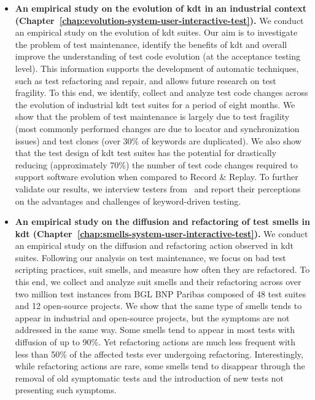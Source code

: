 \begin{itemize}
    \item \textbf{An empirical study on the evolution of \gls{kdt} in an industrial context (Chapter~\ref{chap:evolution-system-user-interactive-test}).} We conduct an empirical study on the evolution of \gls{kdt} suites. Our aim is to investigate the problem of test maintenance, identify the benefits of \gls{kdt} and overall improve the understanding of test code evolution (at the acceptance testing level). This information supports the development of automatic techniques, such as test refactoring and repair, and allows future research on test fragility. To this end, we identify, collect and analyze test code changes across the evolution of industrial \gls{kdt} test suites for a period of eight months. We show that the problem of test maintenance is largely due to test fragility (most commonly performed changes are due to locator and synchronization issues) and test clones (over 30\% of keywords are duplicated). We also show that the test design of \gls{kdt} test suites has the potential for drastically reducing (approximately 70\%) the number of test code changes required to support software evolution when compared to Record \& Replay. To further validate our results, we interview testers from \BGL\ and report their perceptions on the advantages and challenges of keyword-driven testing. 
    
    \item \textbf{An empirical study on the diffusion and refactoring of test smells in \gls{kdt} (Chapter~\ref{chap:smells-system-user-interactive-test}).} We conduct an empirical study on the diffusion and refactoring action observed in \gls{kdt} suites. Following our analysis on test maintenance, we focus on bad test scripting practices, \gls{suit} smells, and measure how often they are refactored. To this end, we collect and analyze \gls{suit} smells and their refactoring across over two million test instances from BGL BNP Paribas composed of 48 test suites and 12 open-source projects. We show that the same type of smells tends to appear in industrial and open-source projects, but the symptoms are not addressed in the same way. Some smells tend to appear in most tests with diffusion of up to 90\%. Yet refactoring actions are much less frequent with less than 50\% of the affected tests ever undergoing refactoring. Interestingly,  while refactoring actions are rare, some smells tend to disappear through the removal of old symptomatic tests and the introduction of new tests not presenting such symptoms.
    

\end{itemize}
